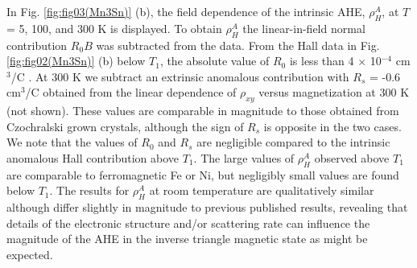 \documentclass[prb,twocolumn,showpacs,preprintnumbers,amsmath,amssymb]{revtex4}
\begin{document}
In Fig. \ref{fig:fig03(Mn3Sn)} (b), the field dependence of the intrinsic AHE, $\rho^{A}_{H}$, at $T$ = 5, 100, and 300 K is displayed. 
To obtain $\rho^{A}_{H}$ the linear-in-field normal contribution $R_0 B$ was subtracted from the data. From the Hall data in Fig. \ref{fig:fig02(Mn3Sn)} (b) below $T_1$, the absolute value of $R_0$ is less than 4 $\times$ 10$^{-4}$ cm$^{3}$/C . At 300 K we subtract an extrinsic anomalous contribution with $R_s$ = -0.6 cm$^{3}$/C obtained from the linear dependence of $\rho_{xy}$ versus magnetization at 300 K (not shown). These values are comparable in magnitude to those obtained from Czochralski grown crystals,\cite{Nakatsuji2015} although the sign of $R_s$ is opposite in the two cases. We note that the values of $R_0$ and $R_s$ are negligible compared to the intrinsic anomalous Hall contribution above $T_1$.
The large values of $\rho^{A}_{H}$ observed above $T_1$ are comparable to ferromagnetic Fe or Ni,\cite{Nagaosa_2010, YTokuraPRL2007, Nakatsuji2015} but negligibly small values are found  below $T_1$. 
The results for $\rho^{A}_{H}$ at room temperature are qualitatively similar although differ slightly in magnitude to previous published results,\cite{Nakatsuji2015, SParkin2016} revealing that details of the electronic structure and/or scattering rate can influence the magnitude of the AHE in the inverse triangle magnetic state as might be expected. 








\end{document}
